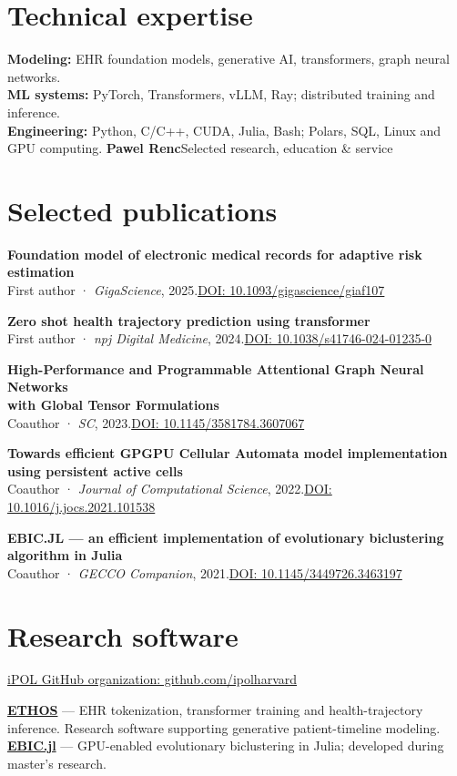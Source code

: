 \documentclass[10pt,letterpaper]{article}
\newcommand{\paper}[3]{\textbf{#1}\\#2\enspace\href{https://doi.org/#3}{DOI: #3}\par\vspace{3pt}}
\begin{document}
\section{Technical expertise}
\textbf{Modeling:} EHR foundation models, generative AI, transformers, graph neural networks.\\
\textbf{ML systems:} PyTorch, Transformers, vLLM, Ray; distributed training and inference.\\
\textbf{Engineering:} Python, C/C++, CUDA, Julia, Bash; Polars, SQL, Linux and GPU computing.
\newpage
{\large\bfseries Pawel Renc}\hfill{\small\color{muted}Selected research, education \& service}
\section{Selected publications}
\paper{Foundation model of electronic medical records for adaptive risk estimation}
{First author · \textit{GigaScience}, 2025.}{10.1093/gigascience/giaf107}
\paper{Zero shot health trajectory prediction using transformer}
{First author · \textit{npj Digital Medicine}, 2024.}{10.1038/s41746-024-01235-0}
\paper{High-Performance and Programmable Attentional Graph Neural Networks\\with Global Tensor Formulations}
{Coauthor · \textit{SC}, 2023.}{10.1145/3581784.3607067}
\paper{Towards efficient GPGPU Cellular Automata model implementation\\using persistent active cells}
{Coauthor · \textit{Journal of Computational Science}, 2022.}{10.1016/j.jocs.2021.101538}
\paper{EBIC.JL — an efficient implementation of evolutionary biclustering algorithm in Julia}
{Coauthor · \textit{GECCO Companion}, 2021.}{10.1145/3449726.3463197}
\section{Research software}
\href{https://github.com/ipolharvard}{iPOL GitHub organization: github.com/ipolharvard}\par
\textbf{\href{https://github.com/ipolharvard/ethos-ares}{ETHOS}} — EHR tokenization, transformer training and health-trajectory inference.
Research software supporting generative patient-timeline modeling.\\
\textbf{\href{https://github.com/EpistasisLab/EBIC.jl}{EBIC.jl}} — GPU-enabled evolutionary biclustering in Julia; developed during master's research.
\end{document}
